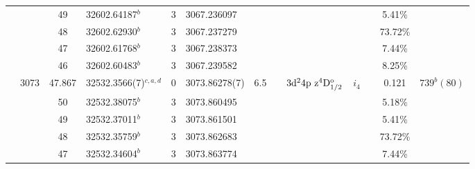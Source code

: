 \begin{table*}
\begin{center}
{\begin{tabular}{:l;l;c;l;c;l;c;l;l;c;c;c;c}
\rowstyle{\itshape}               &        & 49        & 32602.64187$^{b}$                & 3 &   3067.236097      &      & $                                        $ & $                                        $ & $      $ &              & 5.41\%    & $     ^{}     $\\
\rowstyle{\itshape}               &        & 48        & 32602.62930$^{b}$                & 3 &   3067.237279      &      & $                                        $ & $                                        $ & $      $ &              & 73.72\%   & $     ^{}     $\\
\rowstyle{\itshape}               &        & 47        & 32602.61768$^{b}$                & 3 &   3067.238373      &      & $                                        $ & $                                        $ & $      $ &              & 7.44\%    & $     ^{}     $\\
\rowstyle{\itshape}               &        & 46        & 32602.60483$^{b}$                & 3 &   3067.239582      &      & $                                        $ & $                                        $ & $      $ &              & 8.25\%    & $     ^{}     $\\
                                  & 3073   & 47.867    & 32532.3566(7)$^{c,a,d}$          & 0 &    3073.86278(7)   &  6.5 & $                                        $ & $3\rm{d}^24\rm{p~z}^4\rm{D}_{1/2}^{\rm o}$ & $i_{4} $ &              & 0.121     & $  739^{b}(80) $\\
\rowstyle{\itshape}               &        & 50        & 32532.38075$^{b}$                & 3 &   3073.860495      &      & $                                        $ & $                                        $ & $      $ &              & 5.18\%    & $     ^{}     $\\
\rowstyle{\itshape}               &        & 49        & 32532.37011$^{b}$                & 3 &   3073.861501      &      & $                                        $ & $                                        $ & $      $ &              & 5.41\%    & $     ^{}     $\\
\rowstyle{\itshape}               &        & 48        & 32532.35759$^{b}$                & 3 &   3073.862683      &      & $                                        $ & $                                        $ & $      $ &              & 73.72\%   & $     ^{}     $\\
\rowstyle{\itshape}               &        & 47        & 32532.34604$^{b}$                & 3 &   3073.863774      &      & $                                        $ & $                                        $ & $      $ &              & 7.44\%    & $     ^{}     $\\

\end{tabular}}
\end{center}
\end{table*}
